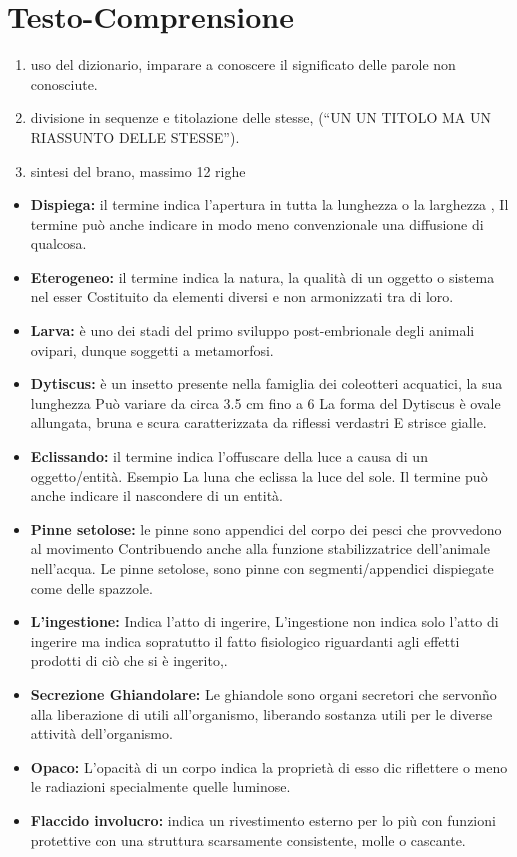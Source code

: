 \documentclass{article}
\begin{document}
\section{Testo-Comprensione}
\begin{enumerate}
  \item uso del dizionario, imparare a conoscere il significato delle parole non conosciute.
  \item divisione in sequenze e titolazione delle stesse, (“UN UN TITOLO MA UN RIASSUNTO DELLE STESSE”).
  \item sintesi del brano, massimo 12 righe
\end{enumerate}
\vspace{2cm}
\begin{itemize}

\item \textbf{Dispiega:} il termine indica l’apertura in tutta la lunghezza o la larghezza ,
Il termine può anche indicare in modo meno convenzionale una diffusione di qualcosa.
\item \textbf{Eterogeneo:} il termine indica la natura, la qualità di un oggetto o sistema nel esser 
Costituito da elementi diversi e non armonizzati tra di loro.
\item \textbf{Larva:} è uno dei stadi del primo sviluppo post-embrionale degli animali ovipari, dunque soggetti a metamorfosi.
\item \textbf{Dytiscus:} è un insetto presente nella famiglia dei coleotteri acquatici, la sua lunghezza
Può variare da circa 3.5 cm  fino a 6
La forma del Dytiscus è ovale allungata, bruna e scura caratterizzata da riflessi verdastri
E strisce gialle.
\item \textbf{Eclissando:}  il termine indica l’offuscare della luce a causa di un oggetto/entità. Esempio 
La luna che eclissa la luce del sole.
Il termine può anche indicare il nascondere di un entità.
\item \textbf{Pinne setolose:} le pinne sono appendici del corpo dei pesci che provvedono al movimento 
Contribuendo anche alla funzione stabilizzatrice dell’animale nell’acqua.
Le pinne setolose, sono pinne con segmenti/appendici dispiegate come delle spazzole.
\item \textbf{L’ingestione:} Indica l’atto di ingerire, L’ingestione non indica solo l’atto di ingerire ma indica sopratutto il fatto fisiologico riguardanti agli effetti prodotti di ciò che si è ingerito,.
\item \textbf{Secrezione Ghiandolare:} Le ghiandole sono organi secretori che servonño alla liberazione di utili all’organismo, liberando sostanza utili per le diverse attività dell’organismo.
\item \textbf{Opaco:} L'opacità di un corpo indica la proprietà di esso dic riflettere o meno le radiazioni specialmente quelle luminose. 
\item \textbf{Flaccido involucro:} indica un rivestimento esterno per lo più con funzioni protettive con una struttura scarsamente consistente, molle o cascante.

\end{itemize}
\end{document}
